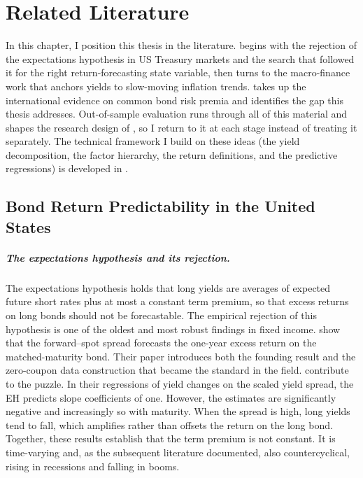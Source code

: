 \chapter{Related Literature}
\label{ch:literature}

In this chapter, I position this thesis in the literature.
 begins with the rejection of the expectations
hypothesis in US Treasury markets and the search that followed it for the right
return-forecasting state variable, then turns to the macro-finance work that
anchors yields to slow-moving inflation trends. 
takes up the international evidence on common bond risk premia and identifies
the gap this thesis addresses. Out-of-sample evaluation runs through all of
this material and shapes the research design of , so I
return to it at each stage instead of treating it separately. The technical framework I build on
these ideas (the yield decomposition, the factor hierarchy, the return
definitions, and the predictive regressions) is developed in
.

\section{Bond Return Predictability in the United States}
\label{sec:lit-us}

\paragraph{The expectations hypothesis and its rejection.}
\label{sec:lit-eh}

The expectations hypothesis holds that long yields are averages of expected
future short rates plus at most a constant term premium, so that excess
returns on long bonds should not be forecastable. The empirical rejection
of this hypothesis is one of the oldest and most robust findings in fixed
income. \citet{famabliss1987} show that the forward--spot spread forecasts
the one-year excess return on the matched-maturity bond. Their paper
introduces both the founding result and the zero-coupon data construction
that became the standard in the field. \citet{campbell1991} contribute to the puzzle. In their regressions of yield changes on
the scaled yield spread, the EH predicts slope coefficients of one.
However, the estimates are significantly negative and increasingly so with
maturity. When the spread is high, long yields tend to fall, which
amplifies rather than offsets the return on the long bond. Together, these
results establish that the term premium is not constant. It is time-varying and, as the subsequent literature documented, also
countercyclical, rising in recessions and falling in booms.

